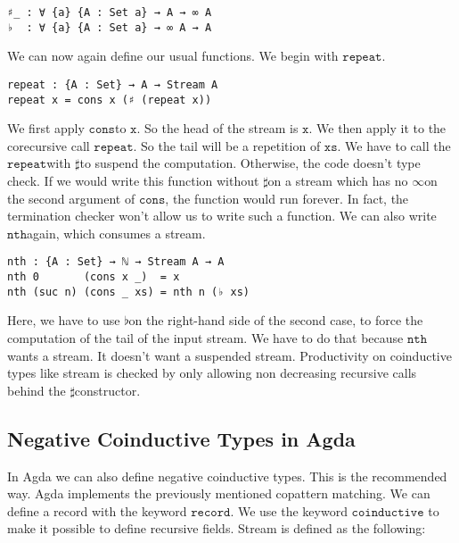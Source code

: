\documentclass[a4paper,cleardoubleempty,BCOR1cm]{scrbook}
\begin{document}
\begin{verbatim}
♯_ : ∀ {a} {A : Set a} → A → ∞ A
♭  : ∀ {a} {A : Set a} → ∞ A → A
\end{verbatim}

We can now again define our usual functions.  We begin with $\mathtt{repeat}$.

\begin{verbatim}
repeat : {A : Set} → A → Stream A
repeat x = cons x (♯ (repeat x))
\end{verbatim}

We first apply $\mathtt{cons}$\;to $\mathtt{x}$. So the head of the stream is $\mathtt{x}$. We then apply
it to the corecursive call $\mathtt{repeat}$. So the tail will be a repetition of
$\mathtt{xs}$. We have to call the $\mathtt{repeat}$\;with $\mathtt{\sharp}$\;to suspend the computation.
Otherwise, the code doesn't type check. If we would write this function
without $\mathtt{\sharp}$\;on a stream which has no $\mathtt{\infty}$\;on the second argument of
$\mathtt{cons}$, the function would run forever. In fact, the termination checker won't
allow us to write such a function. We can also write $\mathtt{nth}$\;again, which
consumes a stream.

\begin{verbatim}
nth : {A : Set} → ℕ → Stream A → A
nth 0       (cons x _)  = x
nth (suc n) (cons _ xs) = nth n (♭ xs)
\end{verbatim}

Here, we have to use $\mathtt{\flat}$\;on the right-hand side of the second case, to
force the computation of the tail of the input stream.  We have to do that
because $\mathtt{nth}$\;wants a stream.  It doesn't want a suspended stream.
Productivity on coinductive types like stream is checked by only allowing non
decreasing recursive calls behind the $\mathtt{\sharp}$\;constructor.

\subsection{Negative Coinductive Types in Agda}
\label{sec:orgb5ad2c7}
In Agda we can also define negative coinductive types.  This is the
recommended way.  Agda implements the previously mentioned copattern matching.
We can define a record with the keyword $\mathtt{record}$.  We use the keyword $\mathtt{coinductive}$
to make it possible to define recursive fields.  Stream is defined as the
following:
\end{document}
